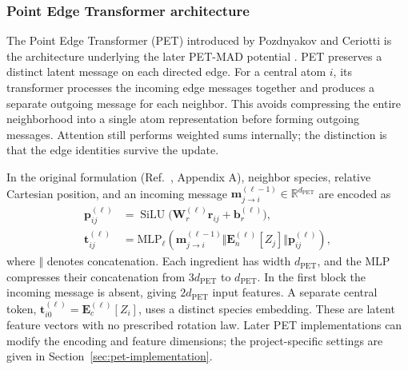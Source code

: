 \documentclass[10pt,a4paper,twocolumn]{article}
\begin{document}
\subsubsection{Point Edge Transformer architecture}
\label{sec:pet-architecture}

The Point Edge Transformer (PET) introduced by Pozdnyakov and Ceriotti
\cite{pet} is the architecture underlying the later PET-MAD potential
\cite{petmad}. PET preserves a distinct latent message on each directed edge.
For a central atom $i$, its transformer processes the incoming edge messages
together and produces a separate outgoing message for each neighbor. This
avoids compressing the entire neighborhood into a single atom representation
before forming outgoing messages. Attention still performs weighted sums
internally; the distinction is that the edge identities survive the update.

In the original formulation (Ref.~\cite{pet}, Appendix A), neighbor species,
relative Cartesian position, and an incoming message
$\bm m_{j\to i}^{(\ell-1)}\in\mathbb R^{d_{\mathrm{PET}}}$ are encoded as
\begin{align}
  \bm p_{ij}^{(\ell)}
    &=\operatorname{SiLU}\bigl(\bm W_r^{(\ell)}\bm r_{ij}
                                      +\bm b_r^{(\ell)}\bigr),
  \\
  \bm t_{ij}^{(\ell)}
    &=\mathrm{MLP}_\ell\!\left(
      \bm m_{j\to i}^{(\ell-1)}\Vert
      \bm E_n^{(\ell)}[Z_j]\Vert
      \bm p_{ij}^{(\ell)}\right),
  \label{eq:pet-token}
\end{align}
where $\Vert$ denotes concatenation. Each ingredient has width
$d_{\mathrm{PET}}$, and the MLP compresses their concatenation from
$3d_{\mathrm{PET}}$ to $d_{\mathrm{PET}}$. In the first block the incoming
message is absent, giving $2d_{\mathrm{PET}}$ input features. A separate
central token, $\bm t_{i0}^{(\ell)}=\bm E_c^{(\ell)}[Z_i]$, uses a distinct
species embedding. These are latent feature vectors with no prescribed
rotation law. Later PET implementations can modify the encoding and feature
dimensions; the project-specific settings are given in
Section~\ref{sec:pet-implementation}.
\end{document}
